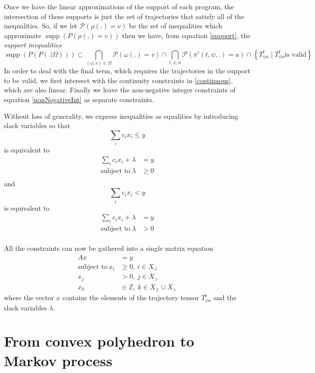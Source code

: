 \documentclass{article}
\DeclareMathOperator\supp{supp}
\begin{document}
Once we have the linear approximations of the support of each program, the intersection of these supports is just the set of trajectories that satisfy all of the inequalities. So, if we let $\mathcal{P}(\rho(.)=v)$ be the set of inequalities which approximate $\supp(P(\rho(.)=v))$ then we have, from equation \ref{support}, the \textit{support inequalities}
\begin{equation}
\supp(P(P(.|\Omega))) \subset
\bigcap_{(\omega,v) \in \Omega}  \mathcal{P}(\omega(.) = v) \cap
\bigcap_{t, \psi, a} \mathcal{P}(\pi'(t,\psi,.)=a) \cap
\left\{T^t_{\psi a} \mid T^t_{\psi a} \text{is valid}\right\}
\label{linearSupport}
\end{equation}
In order to deal with the final term, which requires the trajectories in the support to be valid, we first intersect with the continuity constraints in \ref{continuous}, which are also linear. Finally we leave the non-negative integer constraints of equation \ref{nonNegativeInt} as separate constraints.

Without loss of generality, we express inequalities as equalities by introducing slack variables so that
\[
\sum_i c_i x_i \le y
\]
is equivalent to
\[
\begin{split}
 \sum_i c_i x_i + \lambda & = y \\
\text{subject to}\ \lambda & \ge 0 \\
\end{split}
\]
and
\[
\sum_i c_i x_i < y
\]
is equivalent to
\[
\begin{split}
 \sum_i c_i x_i + \lambda & = y \\
\text{subject to}\ \lambda & > 0 \\
\end{split}
\]

All the constraints can now be gathered into a single matrix equation
\[
\begin{split}
Ax &= y \\
\text{subject to}\ x_i &\ge 0,\  i \in X_{\ge}\\
x_j &> 0, \ j \in X_{>}\\
x_k &\in \mathbb{Z}, \ k \in X_{\ge} \cup X_{>}
\end{split}
\]
where the vector $x$ contains the elements of the trajectory tensor $T^t_{\psi a}$ and the slack variables $\lambda$.

\section{From convex polyhedron to Markov process}
\end{document}
